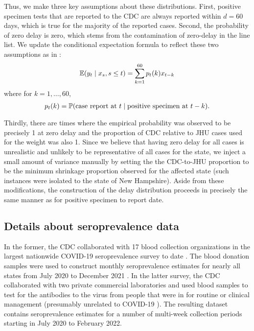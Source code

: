Thus, we make three key assumptions about these distributions. First, positive
specimen tests that are reported to the CDC are always reported within $d = 60$
days, which is true for the majority of the reported cases. Second, the
probability of zero delay is zero, which stems from the contamination of
zero-delay in the line list. We update the
conditional expectation formula to reflect these two assumptions as in \citep{jahja2022real}: 
\begin{align*}
\E(y_t \mid x_s, s \leq t) = \sum_{k=1}^{60} p_t(k) x_{t-k}
\end{align*}
where for $k = 1, \dots, 60$,
\begin{align*}
p_t(k) = \P(\text{case report at }t \mid \text{positive specimen at }t-k).
\end{align*}


Thirdly, there are times where the empirical probability
was observed to be precisely 1 at zero delay and the proportion of CDC relative
to JHU cases used for the weight was also 1. Since we believe that having zero
delay for all cases is unrealistic and unlikely to be representative of all
cases for the state, we inject a small amount of variance manually by setting
the the CDC-to-JHU proportion to be the minimum shrinkage proportion observed
for the affected state (such instances were isolated to the state of New
Hampshire). Aside from these modifications, the construction of the delay
distribution proceeds in precisely the same manner as for positive specimen to
report date. 

\subsection{Details about seroprevalence data}
\label{sec:sero-details}

In the former, the CDC
collaborated with 17 blood collection organizations in the largest nationwide
COVID-19 seroprevalence survey to date \citep{cdc2021blood}. The blood donation
samples were used to construct monthly seroprevalence estimates for nearly all
states from July 2020 to December 2021 \citep{jones2021estimated}. In the latter
survey, the CDC collaborated with two private commercial laboratories and used
blood samples to test for the antibodies to the virus from people that were in
for routine or clinical management (presumably unrelated to COVID-19
\citealp{bajema2021estimated}). The resulting dataset contains seroprevalence
estimates for a number of multi-week collection periods starting in July 2020 to
February 2022. 

